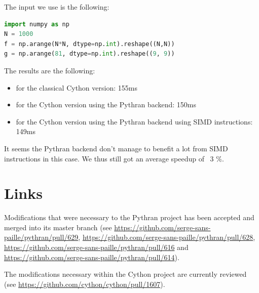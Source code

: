 \documentclass{deliverablereport}
\begin{document}
The input we use is the following:

\begin{lstlisting}[language=python]
import numpy as np
N = 1000
f = np.arange(N*N, dtype=np.int).reshape((N,N))
g = np.arange(81, dtype=np.int).reshape((9, 9))
\end{lstlisting}

The results are the following:

\begin{itemize}
  \item for the classical Cython version: 155ms
  \item for the Cython version using the Pythran backend: 150ms
  \item for the Cython version using the Pythran backend using SIMD instructions: 149ms
\end{itemize}

It seems the Pythran backend don't manage to benefit a lot from SIMD
instructions in this case. We thus still got an average speedup of ~3 \%.

\section{Links}
\label{sec:links}

Modifications that were necessary to the Pythran project has been accepted and
merged into its master branch (see
\url{https://github.com/serge-sans-paille/pythran/pull/629},
\url{https://github.com/serge-sans-paille/pythran/pull/628},
\url{https://github.com/serge-sans-paille/pythran/pull/616} and
\url{https://github.com/serge-sans-paille/pythran/pull/614}).

The modifications necessary within the Cython project are currently reviewed
(see \url{https://github.com/cython/cython/pull/1607}).

\printbibliography
\end{document}
